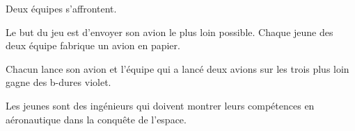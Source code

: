 \documentclass{grand-jeu}
\begin{document}
\begin{liste-materiel}
\end{liste-materiel}

\begin{regles}
Deux équipes s’affrontent.

Le but du jeu est d'envoyer son avion le plus loin possible. Chaque jeune des deux équipe fabrique un avion en papier. 

Chacun lance son avion et l'équipe qui a lancé deux avions sur les trois plus loin gagne des b-dures violet.
\end{regles}

\begin{imaginaire}
Les jeunes sont des ingénieurs qui doivent montrer leurs compétences en aéronautique dans la conquête de l'espace.
\end{imaginaire}

\begin{moments-stop}
\end{moments-stop}
\end{document}
